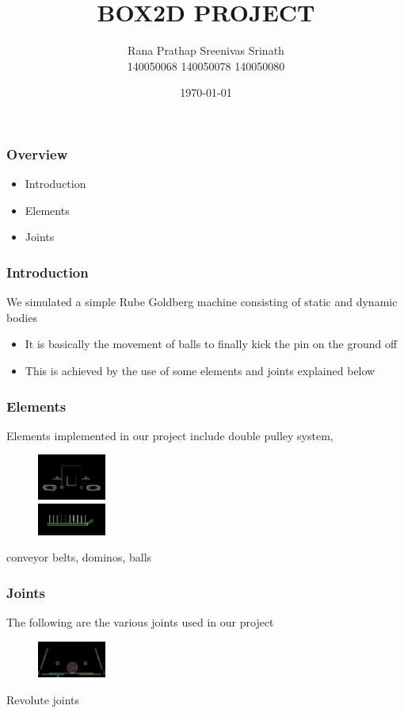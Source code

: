 \documentclass{beamer}
\title{BOX2D PROJECT}
\author{Rana Prathap  \hspace{5pt} Sreenivas \hspace{5pt}  Srinath  \\
        \hspace{15pt} 140050068 \hspace{5pt}     140050078 \hspace{5pt}   140050080\\
        }
\institute{IIT Bombay}
\date{\today}
\begin{document}
 
\frame{\titlepage}
 
\begin{frame}
\frametitle{Overview}
\begin{itemize}
\item<1-> Introduction
\item<1-> Elements
\item<1-> Joints
\end{itemize}
\end{frame}

\begin{frame}
\frametitle{Introduction}
 \vspace{-40pt}
We simulated a simple Rube Goldberg machine consisting of static and dynamic bodies
\begin{itemize}
 \item<1-> It is basically the movement of balls to finally kick the pin on the ground off
 \item<1-> This is achieved by the use of some elements and joints explained below
\end{itemize}
\end{frame}

\begin{frame}
 \frametitle{Elements}
 \vspace{-40pt}
  Elements implemented in our project include double pulley system, 
  \begin{figure} 
   \includegraphics[width=0.2\textwidth]{doublepulley.png}\\
   \includegraphics[width=0.2\textwidth]{dominos.png}
    \end{figure}
  conveyor belts, dominos, balls

\end{frame}

\begin{frame}
 \frametitle{Joints}
 \vspace{-40pt}
  The following are the various joints used in our project
  \begin{figure} 
   \includegraphics[width=0.2\textwidth]{rev.png}
    \end{figure}
  Revolute joints

\end{frame}
 
\end{document}
